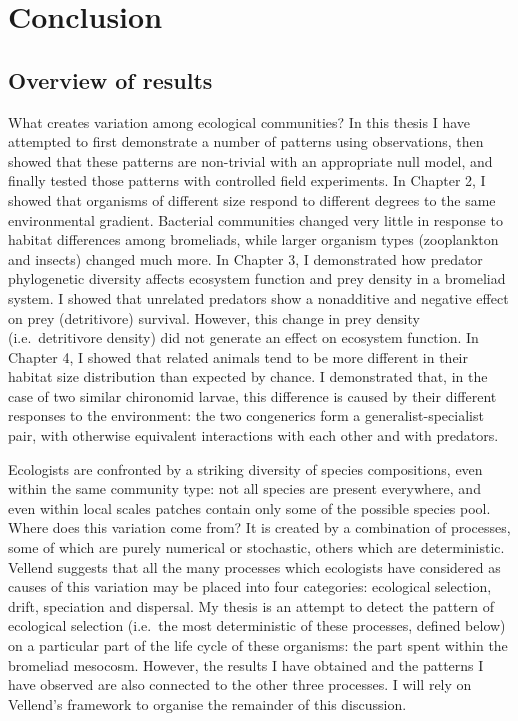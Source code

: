 \chapter{Conclusion}
\label{chap:conclusions}

\section{Overview of results}\label{overview-of-results}

What creates variation among ecological communities? In this thesis I
have attempted to first demonstrate a number of patterns using
observations, then showed that these patterns are non-trivial with an
appropriate null model, and finally tested those patterns with
controlled field experiments. In Chapter 2, I showed that organisms of
different size respond to different degrees to the same environmental
gradient. Bacterial communities changed very little in response to
habitat differences among bromeliads, while larger organism types
(zooplankton and insects) changed much more. In Chapter 3, I
demonstrated how predator phylogenetic diversity affects ecosystem
function and prey density in a bromeliad system. I showed that unrelated
predators show a nonadditive and negative effect on prey (detritivore)
survival. However, this change in prey density (i.e.~detritivore
density) did not generate an effect on ecosystem function. In Chapter 4,
I showed that related animals tend to be more different in their habitat
size distribution than expected by chance. I demonstrated that, in the
case of two similar chironomid larvae, this difference is caused by
their different responses to the environment: the two congenerics form a
generalist-specialist pair, with otherwise equivalent interactions with
each other and with predators.

Ecologists are confronted by a striking diversity of species
compositions, even within the same community type: not all species are
present everywhere, and even within local scales patches contain only
some of the possible species pool. Where does this variation come from?
It is created by a combination of processes, some of which are purely
numerical or stochastic, others which are deterministic. Vellend
\citep{vellendbook} suggests that all the many processes which
ecologists have considered as causes of this variation may be placed
into four categories: ecological selection, drift, speciation and
dispersal. My thesis is an attempt to detect the pattern of ecological
selection (i.e.~the most deterministic of these processes, defined
below) on a particular part of the life cycle of these organisms: the
part spent within the bromeliad mesocosm. However, the results I have
obtained and the patterns I have observed are also connected to the
other three processes. I will rely on Vellend's framework to organise
the remainder of this discussion.

